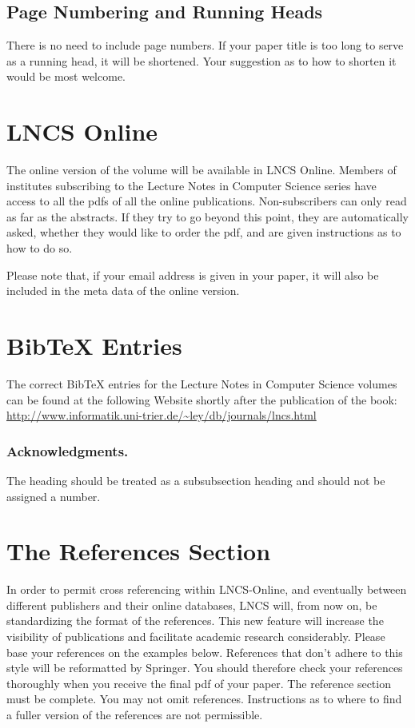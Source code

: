 \documentclass[runningheads]{llncs}
\begin{document}
\subsection{Page Numbering and Running Heads}

There is no need to include page numbers. If your paper title is too
long to serve as a running head, it will be shortened. Your suggestion
as to how to shorten it would be most welcome.

\section{LNCS Online}

The online version of the volume will be available in LNCS Online.
Members of institutes subscribing to the Lecture Notes in Computer
Science series have access to all the pdfs of all the online
publications. Non-subscribers can only read as far as the abstracts. If
they try to go beyond this point, they are automatically asked, whether
they would like to order the pdf, and are given instructions as to how
to do so.

Please note that, if your email address is given in your paper,
it will also be included in the meta data of the online version.

\section{BibTeX Entries}

The correct BibTeX entries for the Lecture Notes in Computer Science
volumes can be found at the following Website shortly after the
publication of the book:
\url{http://www.informatik.uni-trier.de/~ley/db/journals/lncs.html}

\subsubsection*{Acknowledgments.} The heading should be treated as a
subsubsection heading and should not be assigned a number.

\section{The References Section}\label{references}

In order to permit cross referencing within LNCS-Online, and eventually
between different publishers and their online databases, LNCS will,
from now on, be standardizing the format of the references. This new
feature will increase the visibility of publications and facilitate
academic research considerably. Please base your references on the
examples below. References that don't adhere to this style will be
reformatted by Springer. You should therefore check your references
thoroughly when you receive the final pdf of your paper.
The reference section must be complete. You may not omit references.
Instructions as to where to find a fuller version of the references are
not permissible.
\end{document}
